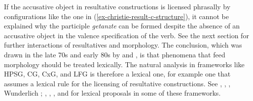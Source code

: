 If the accusative object in resultative constructions is licensed phrasally by
configurations like the one in (\ref{ex-christie-result-c-structure}), it cannot be explained why the participle \emph{getanzte}
can be formed despite the absence of an accusative object in the valence specification of the
verb. See the next section for further interactions of resultatives and morphology.
The conclusion, which was drawn in the late 70s and early 80s by \citet[]{Dowty78a}
and \citet[]{Bresnan82a}, is that phenomena that feed morphology should be treated
lexically. The natural analysis in frameworks like HPSG, CG, CxG, and LFG is therefore a lexical
one, for example one that assumes a lexical rule for the licensing of resultative constructions. See
, , , Wunderlich \citeyear[]{Wunderlich92a-u-kopiert}; \citeyear[--126]{Wunderlich97c}, ,
 , 
 and \citet{Christie2015a-u} for lexical proposals in some of  these frameworks. 




